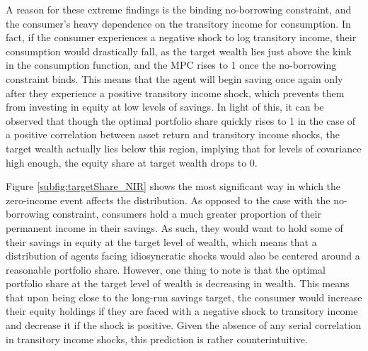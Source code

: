A reason for these extreme findings is the binding no-borrowing constraint, and the consumer's heavy dependence on the transitory income for consumption. In fact, if the consumer experiences a negative shock to log transitory income, their consumption would drastically fall, as the target wealth lies just above the kink in the consumption function, and the MPC rises to 1 once the no-borrowing constraint binds. This means that the agent will begin saving once again only after they experience a positive transitory income shock, which prevents them from investing in equity at low levels of savings. In light of this, it can be observed that though the optimal portfolio share quickly rises to 1 in the case of a positive correlation between asset return and transitory income shocks, the target wealth actually lies below this region, implying that for levels of covariance high enough, the equity share at target wealth drops to 0.

Figure \ref{subfig:targetShare_NIR} shows the most significant way in which the zero-income event affects the distribution. As opposed to the case with the no-borrowing constraint, consumers hold a much greater proportion of their permanent income in their savings. As such, they would want to hold some of their savings in equity at the target level of wealth, which means that a distribution of agents facing idiosyncratic shocks would also be centered around a reasonable portfolio share. However, one thing to note is that the optimal portfolio share at the target level of wealth is decreasing in wealth. This means that upon being close to the long-run savings target, the consumer would increase their equity holdings if they are faced with a negative shock to transitory income and decrease it if the shock is positive. Given the absence of any serial correlation in transitory income shocks, this prediction is rather counterintuitive.